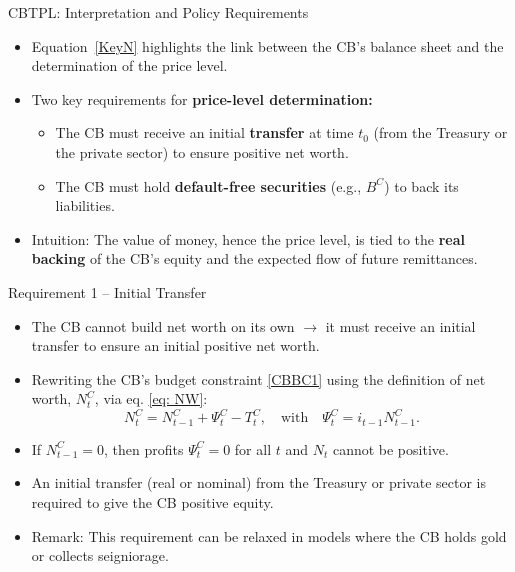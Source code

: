 \documentclass[11pt,aspectratio=169]{beamer}
\begin{document}
\begin{frame}{CBTPL: Interpretation and Policy Requirements}


\begin{itemize}
  \item Equation~\eqref{KeyN} highlights the link between the CB’s balance sheet 
  and the determination of the price level.

  \vspace{0.3cm}
  \item Two key requirements for \textbf{price-level determination:}
  \begin{itemize}
    \item The CB must receive an initial \textbf{transfer} at time $t_0$ 
    (from the Treasury or the private sector) to ensure positive net worth.
    \item The CB must hold \textbf{default-free securities} (e.g., $B^C$) 
    to back its liabilities.
  \end{itemize}

  \vspace{0.3cm}
  \item Intuition:  
  The value of money, hence the price level, is tied to the \textbf{real backing} 
  of the CB’s equity and the expected flow of future remittances.
\end{itemize}

\end{frame}


\begin{frame}{Requirement 1 -- Initial Transfer}
\begin{itemize}
    \item The CB cannot build net worth on its own $\rightarrow$ it must receive an initial transfer to ensure an initial positive net worth.
    \vspace{0.25cm}
    \item Rewriting the CB's budget constraint \eqref{CBBC1} using the definition of net worth, $N_t^C$, via eq. \eqref{eq: NW}:
    \[
    N_t^C = N_{t-1}^C + \Psi_t^C - T_t^C, 
     \quad \text{with} \quad \Psi_t^C = i_{t-1} N_{t-1}^C.
    \]
    \vspace{0.25cm}
    \item If $N_{t-1}^C = 0$, then profits $\Psi_t^C = 0$ for all $t$ and $N_{t}$ cannot be positive.
    \vspace{0.25cm}
    \item  An initial transfer (real or nominal) from the Treasury or private sector is required to give the CB positive equity.
    \vspace{0.25cm}
    \item Remark: 
    This requirement can be relaxed in models where the CB holds gold or collects seigniorage.
\end{itemize}
\end{frame}
\end{document}
